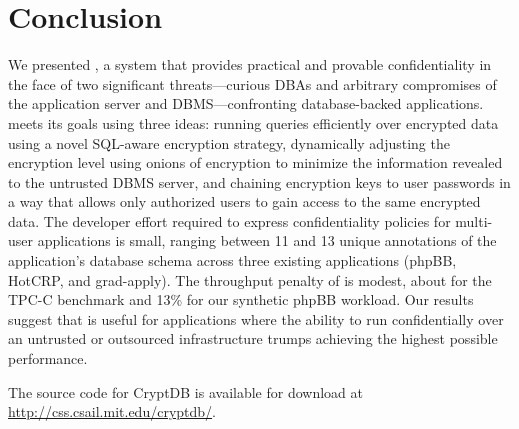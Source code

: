 \section{Conclusion}
\label{s:concl}

We presented \name{}, a system that provides practical and provable
confidentiality in the face of two significant threats---curious DBAs
and arbitrary compromises of the application server and
DBMS---confronting database-backed applications.  \name{} meets its
goals using three ideas: running queries efficiently over encrypted
data using a novel SQL-aware encryption strategy, dynamically
adjusting the encryption level using onions of encryption to minimize
the information revealed to the untrusted DBMS server, and chaining
encryption keys to user passwords in a way that allows only authorized
users to gain access to the same encrypted data.  The developer effort
required to express confidentiality policies for multi-user
applications is small, ranging between 11 and 13 unique annotations of
the application's database schema across three existing applications
(phpBB, HotCRP, and grad-apply).  The throughput penalty of \name{} is
modest, about \tput{} for the TPC-C benchmark and 13\% for our
synthetic phpBB workload.  Our results suggest that \name{} is useful
for applications where the ability to run confidentially over an
untrusted or outsourced infrastructure trumps achieving the highest
possible performance.

The source code for CryptDB is available for download at
\url{http://css.csail.mit.edu/cryptdb/}.


